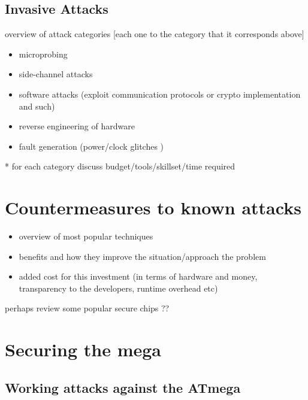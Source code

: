 \documentclass[12pt,a4paper,twocolumn]{article}
\begin{document}
	\subsection{Invasive Attacks}

	overview of attack categories [each one to the category that it corresponds above]
	\begin{itemize}
		\item microprobing \\
		\item side-channel attacks \\
		\item software attacks (exploit communication protocols or crypto implementation and such) \\
		\item reverse engineering of hardware\\
		\item fault generation (power/clock glitches ) \\
	\end{itemize}
	
	* for each category discuss budget/tools/skillset/time required\\

\section{Countermeasures to known attacks}
\label{sec:defenses}
	\begin{itemize}
	\item overview of most popular techniques \\
	\item benefits and how they improve the situation/approach the problem
	\item added cost for this investment (in terms of hardware and money, transparency to the developers, runtime overhead etc)\\
	\end{itemize}
	
	perhaps review some popular secure chips ??	
	
	

\section{Securing the mega}
\label{sec:securing_mega}
	\subsection{Working attacks against the ATmega}
\end{document}
